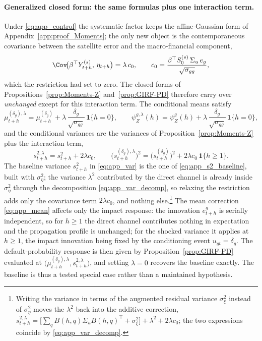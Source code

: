 \paragraph{Generalized closed form: the same formulas plus one interaction term.}
Under \eqref{eq:app_control} the systematic factor keeps the affine-Gaussian
form of Appendix~\ref{app:proof_Moments}; the only new object is the
contemporaneous covariance between the satellite error and the macro-financial
component,
\begin{equation}
    \Cov\!\big(\beta^\top Y_{t+h}^{(s)},\,\eta_{t+h}\big)
    =
    \lambda\, c_0,
    \qquad
    c_0
    =
    \frac{\beta^\top S_0^{(s)}\,\Sigma_u\, e_g}{\sqrt{\sigma_{gg}}},
    \label{eq:app_c0}
\end{equation}
which the restriction had set to zero. The closed forms of
Propositions~\ref{prop:Moments-Z} and~\ref{prop:GIRF-PD} therefore carry over
\emph{unchanged} except for this interaction term. The conditional means satisfy
\begin{equation}
    \mu_{t+h}^{(\delta_g),\lambda}
    =
    \mu_{t+h}^{(\delta_g)}
    +
    \lambda\,\frac{\delta_g}{\sqrt{\sigma_{gg}}}\,\mathbf 1\{h=0\},
    \qquad
    \psi_Z^{g,\lambda}(h)
    =
    \psi_Z^{g}(h)
    +
    \lambda\,\frac{\delta_g}{\sqrt{\sigma_{gg}}}\,\mathbf 1\{h=0\},
    \label{eq:app_mean}
\end{equation}
and the conditional variances are the variances of
Proposition~\ref{prop:Moments-Z} plus the interaction term,
\begin{equation}
    s_{t+h}^{2,\lambda}
    =
    s_{t+h}^2
    +
    2\lambda c_0,
    \qquad
    \big(s_{t+h}^{(\delta_g),\lambda}\big)^2
    =
    \big(s_{t+h}^{(\delta_g)}\big)^2
    +
    2\lambda c_0\,\mathbf 1\{h\ge1\}.
    \label{eq:app_var}
\end{equation}
The baseline variance $s_{t+h}^2$ in \eqref{eq:app_var} is the one of
\eqref{eq:app_s2_baseline}, built with $\sigma_\eta^2$; the variance
$\lambda^2$ contributed by the direct channel is already inside $\sigma_\eta^2$
through the decomposition \eqref{eq:app_var_decomp}, so relaxing the restriction
adds only the covariance term $2\lambda c_0$, and nothing else.\footnote{Writing
the variance in terms of the augmented residual variance $\sigma_\xi^2$ instead
of $\sigma_\eta^2$ moves the $\lambda^2$ back into the additive correction,
$s_{t+h}^{2,\lambda}=\big[\sum_q B(h,q)\Sigma_u B(h,q)^\top+\sigma_\xi^2\big]
+\lambda^2+2\lambda c_0$; the two expressions coincide by
\eqref{eq:app_var_decomp}.} The mean correction \eqref{eq:app_mean} affects only
the impact response: the innovation $e_{t+h}^{g}$ is serially independent, so for
$h\ge1$ the direct channel contributes nothing in expectation and the
propagation profile is unchanged; for the shocked variance it applies at
$h\ge1$, the impact innovation being fixed by the conditioning event
$u_{gt}=\delta_g$. The default-probability response is then given by
Proposition~\ref{prop:GIRF-PD} evaluated at
$\big(\mu_{t+h}^{(\delta_g),\lambda},s_{t+h}^{2,\lambda}\big)$, and setting
$\lambda=0$ recovers the baseline exactly. The baseline is thus a tested special
case rather than a maintained hypothesis.

